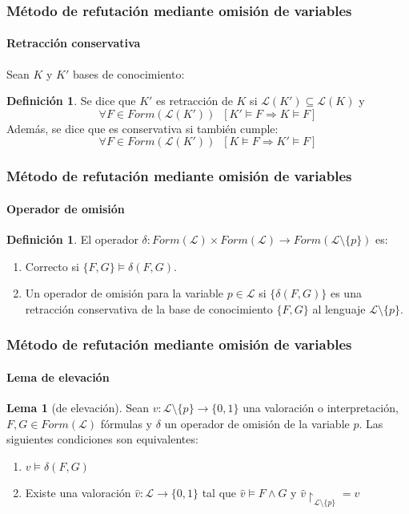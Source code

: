 \documentclass[12pt,a4paper]{beamer}
\theoremstyle{definition}
\newtheorem{lem}[thm]{Lema}
\newtheorem{defn}[thm]{Definición}
\theoremstyle{remark}
\begin{document}
\begin{frame}
\frametitle{\normalsize{Método de refutación mediante omisión de variables}}
\framesubtitle{Retracción conservativa}
\noindent Sean $K$ y $K'$ bases de conocimiento: 
\begin{defn}	
Se dice que $K'$ es \alert{retracción} de $K$ si $\mathcal{L}(K') \subseteq \mathcal{L}(K)$ y
 $$\forall F \in Form (\mathcal{L} (K')) \;\; [K' \vDash F \Rightarrow K \vDash
 F]$$
 Además, se dice que es \alert{conservativa} si también cumple:
 $$\forall F \in Form (\mathcal{L} (K')) \;\; [K \vDash F \Rightarrow K' \vDash
 F]$$
 \end{defn}
\end{frame}

\begin{frame}
\frametitle{\normalsize{Método de refutación mediante omisión de variables}}
\framesubtitle{Operador de omisión}
\begin{defn}
El operador $\delta :Form(\mathcal{L}) \times Form(\mathcal{L}) \rightarrow Form(\mathcal{L} \setminus \{ p \})$  es:

\begin{enumerate}
\item \alert{Correcto} si $\{F,G\} \vDash \delta (F,G)$.
\item Un \alert{operador de omisión} para la variable $p \in \mathcal{L}$ si 
$\{ \delta (F,G) \}$ es una retracción conservativa de la base de conocimiento $\{ F,G \}$ al lenguaje $\mathcal{L} \setminus \{ p \}$.
\end{enumerate} 
\end{defn}


\end{frame}

\begin{frame}
\frametitle{\normalsize{Método de refutación mediante omisión de variables}}
\framesubtitle{Lema de elevación}
\begin{lem}[de elevación]
 Sean $v :\mathcal{L} \setminus \{p\} \rightarrow \{ 0,1 \}$ una valoración o interpretación, $F, G \in Form(\mathcal{L})$ fórmulas y $\delta$ un operador de omisión de la variable $p$. Las siguientes condiciones son equivalentes:
\begin{enumerate}
\item $v \vDash \delta (F,G)$
\item Existe una valoración $\hat{v} : \mathcal{L} \rightarrow \{ 0,1 \}$ tal que $\hat{v} \vDash F \wedge G$ y $\hat{v} \upharpoonright_{\mathcal{L} \setminus \{ p \}} = v $
\end{enumerate}
\end{lem}
\end{frame}
\end{document}
